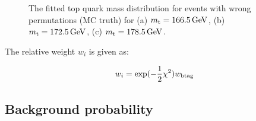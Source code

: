 \begin{figure}[!htpb]
\begin{center}
    \hfill
	\caption{\label{fig:fitted_ttbar_wp_density}
    The fitted top quark mass distribution for \ttbar events with wrong permutations (MC truth) for (a)
    $\mtop=\SI{166.5}{\GeV}$, (b) $\mtop=\SI{172.5}{\GeV}$, (c) $\mtop=\SI{178.5}{\GeV}$.}
\end{center}
\end{figure}

The relative weight $w_i$ is given as:

\begin{equation}
w_i = \textrm{exp}(-\frac{1}{2}\chi^2) w_{\rm btag}
\end{equation}

\subsection{Background probability}


